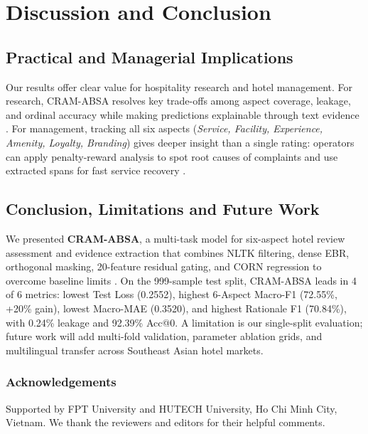 \documentclass{llncs}
\begin{document}
\section{Discussion and Conclusion}
\label{sec:discussion_conclusion}

\subsection{Practical and Managerial Implications}
\label{subsec:discussion_implications}
Our results offer clear value for hospitality research and hotel management. For research, CRAM-ABSA resolves key trade-offs among aspect coverage, leakage, and ordinal accuracy while making predictions explainable through text evidence \cite{ref16_shin2024}. For management, tracking all six aspects (\textit{Service, Facility, Experience, Amenity, Loyalty, Branding}) gives deeper insight than a single rating: operators can apply penalty-reward analysis \cite{ref13_zhang2022} to spot root causes of complaints and use extracted spans for fast service recovery \cite{ref15_pang2025}.

\subsection{Conclusion, Limitations and Future Work}
\label{subsec:conclusion_future_work}
We presented \textbf{CRAM-ABSA}, a multi-task model for six-aspect hotel review assessment and evidence extraction that combines NLTK filtering, dense EBR, orthogonal masking, 20-feature residual gating, and CORN regression to overcome baseline limits \cite{ref01_bimaputra2023,ref04_namee2023,ref09_nadeem2025}. On the 999-sample test split, CRAM-ABSA leads in 4 of 6 metrics: lowest Test Loss (0.2552), highest 6-Aspect Macro-F1 (72.55\%, +20\% gain), lowest Macro-MAE (0.3520), and highest Rationale F1 (70.84\%), with 0.24\% leakage and 92.39\% Acc@0. A limitation is our single-split evaluation; future work will add multi-fold validation, parameter ablation grids, and multilingual transfer across Southeast Asian hotel markets.

\subsubsection*{Acknowledgements}
Supported by FPT University and HUTECH University, Ho Chi Minh City, Vietnam. We thank the reviewers and editors for their helpful comments.
\end{document}

